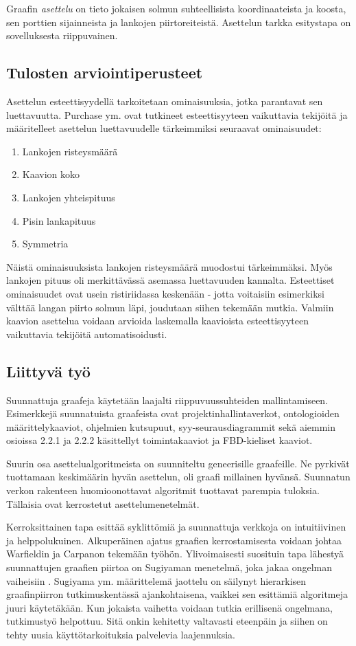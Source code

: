 \documentclass[finnish,12pt]{article}
\begin{document}
Graafin \emph{asettelu} on tieto jokaisen solmun suhteellisista koordinaateista ja koosta, sen porttien sijainneista ja lankojen piirtoreiteistä. 
Asettelun tarkka esitystapa on sovelluksesta riippuvainen.

 		\subsection{Tulosten arviointiperusteet}

Asettelun esteettisyydellä tarkoitetaan ominaisuuksia, jotka parantavat sen luettavuutta.
Purchase ym. \cite{RefWorks:47} ovat tutkineet esteettisyyteen vaikuttavia tekijöitä ja määritelleet asettelun luettavuudelle tärkeimmiksi seuraavat ominaisuudet: 
\begin{enumerate}
  \item Lankojen risteysmäärä
  \item Kaavion koko
  \item Lankojen yhteispituus
  \item Pisin lankapituus
  \item Symmetria
\end{enumerate}

Näistä ominaisuuksista lankojen risteysmäärä muodostui tärkeimmäksi. Myös lankojen pituus oli merkittävässä asemassa luettavuuden kannalta.
Esteettiset ominaisuudet ovat usein ristiriidassa keskenään - jotta voitaisiin esimerkiksi välttää langan piirto solmun läpi, joudutaan siihen tekemään mutkia.
Valmiin kaavion asettelua voidaan arvioida laskemalla kaavioista esteettisyyteen vaikuttavia tekijöitä automatisoidusti.


	\subsection{Liittyvä työ}

Suunnattuja graafeja käytetään laajalti riippuvuussuhteiden mallintamiseen.
Esimerkkejä suunnatuista graafeista ovat projektinhallintaverkot, ontologioiden määrittelykaaviot, ohjelmien kutsupuut, syy-seurausdiagrammit sekä aiemmin osioissa 2.2.1 ja 2.2.2 käsittellyt toimintakaaviot ja FBD-kieliset kaaviot.

Suurin osa asettelualgoritmeista on suunniteltu geneerisille graafeille.
Ne pyrkivät tuottamaan keskimäärin hyvän asettelun, oli graafi millainen hyvänsä.
Suunnatun verkon rakenteen huomioonottavat algoritmit tuottavat parempia tuloksia.
Tällaisia ovat kerrostetut asettelumenetelmät.

Kerroksittainen tapa esittää syklittömiä ja suunnattuja verkkoja on intuitiivinen ja helppolukuinen.
Alkuperäinen ajatus graafien kerrostamisesta voidaan johtaa Warfieldin \cite{RefWorks:58} ja Carpanon \cite{RefWorks:57} tekemään työhön.
Ylivoimaisesti suosituin tapa lähestyä suunnattujen graafien piirtoa on Sugiyaman menetelmä, joka jakaa ongelman vaiheisiin \cite{RefWorks:9}.
Sugiyama ym. määrittelemä jaottelu on säilynyt hierarkisen graafinpiirron tutkimuskentässä ajankohtaisena, vaikkei sen esittämiä algoritmeja juuri käytetäkään.
Kun jokaista vaihetta voidaan tutkia erillisenä ongelmana, tutkimustyö helpottuu.
Sitä onkin kehitetty valtavasti eteenpäin ja siihen on tehty uusia käyttötarkoituksia palvelevia laajennuksia.
\end{document}
